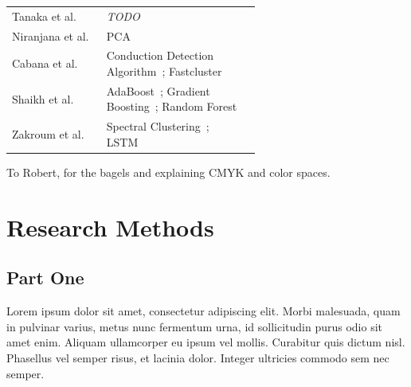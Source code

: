 \documentclass[manuscript,nonacm]{acmart}
\begin{document}
\begin{table}[]
\begin{tabular}{lp{0.62\linewidth}}
        Tanaka et al.~\cite{2023tanaka,2021tanaka}             & \textit{TODO} \\
        Niranjana et al.~\cite{2019niranjana}                  & PCA~\cite{1901pearson,1993hotelling} \\
        Cabana et al.~\cite{2019cabana}                        & Conduction Detection Algorithm~\cite{2015lu}; Fastcluster~\cite{2013mullner} \\
        Shaikh et al.~\cite{2018shaikh}                        & AdaBoost~\cite{@@}; Gradient Boosting~\cite{@@}; Random Forest~\cite{@@} \\
        Zakroum et al.~\cite{2022zakroum,2018zakroum}          & Spectral Clustering~\cite{2001ng}; LSTM~\cite{1997hochreiter} \\
        \bottomrule
    \end{tabular}
\end{table}


\begin{acks}
To Robert, for the bagels and explaining CMYK and color spaces.
\end{acks}




\appendix
\section{Research Methods}

\subsection{Part One}

Lorem ipsum dolor sit amet, consectetur adipiscing elit. Morbi
malesuada, quam in pulvinar varius, metus nunc fermentum urna, id
sollicitudin purus odio sit amet enim. Aliquam ullamcorper eu ipsum
vel mollis. Curabitur quis dictum nisl. Phasellus vel semper risus, et
lacinia dolor. Integer ultricies commodo sem nec semper.
\end{document}

